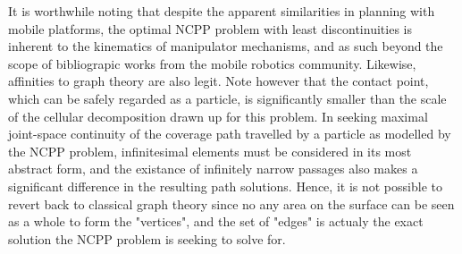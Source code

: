\documentclass[journal]{IEEEtran}
\begin{document}
It is worthwhile noting that despite the apparent similarities in planning with mobile platforms, the optimal NCPP problem with least discontinuities 
is inherent to the kinematics of manipulator mechanisms, and as such beyond the scope of bibliograpic works from the mobile robotics community.
Likewise, affinities to graph theory are also legit. Note however that the contact point, which can be safely regarded as a particle, 
is significantly smaller than the scale of the cellular decomposition drawn up for this problem. 
In seeking maximal joint-space continuity of the coverage path travelled by a particle as modelled by the NCPP problem, 
infinitesimal elements must be considered in its most abstract form, and the existance of infinitely narrow passages also 
makes a significant difference in the resulting path solutions. %
Hence, it is not possible to revert back to classical graph theory since no any area on the surface can be seen as a whole to form the "vertices", 
and the set of "edges" is actualy the exact solution the NCPP problem is seeking to solve for. 
\end{document}
